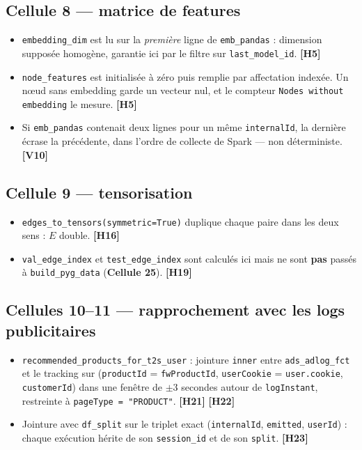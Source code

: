\documentclass[11pt,a4paper]{article}
\newcommand{\code}[1]{\texttt{\small #1}}
\newcommand{\hyp}[1]{\textcolor{hypcol}{\textbf{\small [#1]}}}
\newcommand{\cell}[1]{\textbf{Cellule #1}}
\begin{document}
\subsection*{\cell{8} --- matrice de features}
\begin{itemize}[nosep,leftmargin=*]
  \item \code{embedding\_dim} est lu sur la \emph{première} ligne de
        \code{emb\_pandas} : dimension supposée homogène, garantie ici par le filtre
        sur \code{last\_model\_id}. \hyp{H5}
  \item \code{node\_features} est initialisée à zéro puis remplie par affectation
        indexée. Un nœud sans embedding garde un vecteur nul, et le compteur
        \code{Nodes without embedding} le mesure. \hyp{H5}
  \item Si \code{emb\_pandas} contenait deux lignes pour un même \code{internalId},
        la dernière écrase la précédente, dans l'ordre de collecte de Spark ---
        non déterministe. \hyp{V10}
\end{itemize}

\subsection*{\cell{9} --- tensorisation}
\begin{itemize}[nosep,leftmargin=*]
  \item \code{edges\_to\_tensors(symmetric=True)} duplique chaque paire dans les deux
        sens : $E$ double. \hyp{H16}
  \item \code{val\_edge\_index} et \code{test\_edge\_index} sont calculés ici mais ne
        sont \textbf{pas} passés à \code{build\_pyg\_data} (\cell{25}). \hyp{H19}
\end{itemize}

\subsection*{Cellules 10--11 --- rapprochement avec les logs publicitaires}
\begin{itemize}[nosep,leftmargin=*]
  \item \code{recommended\_products\_for\_t2s\_user} : jointure \code{inner} entre
        \code{ads\_adlog\_fct} et le tracking sur
        (\code{productId} = \code{fwProductId}, \code{userCookie} =
        \code{user.cookie}, \code{customerId}) dans une fenêtre de $\pm 3$ secondes
        autour de \code{logInstant}, restreinte à \code{pageType = "PRODUCT"}.
        \hyp{H21} \hyp{H22}
  \item Jointure avec \code{df\_split} sur le triplet exact
        (\code{internalId}, \code{emitted}, \code{userId}) : chaque exécution hérite
        de son \code{session\_id} et de son \code{split}. \hyp{H23}
\end{itemize}
\end{document}
